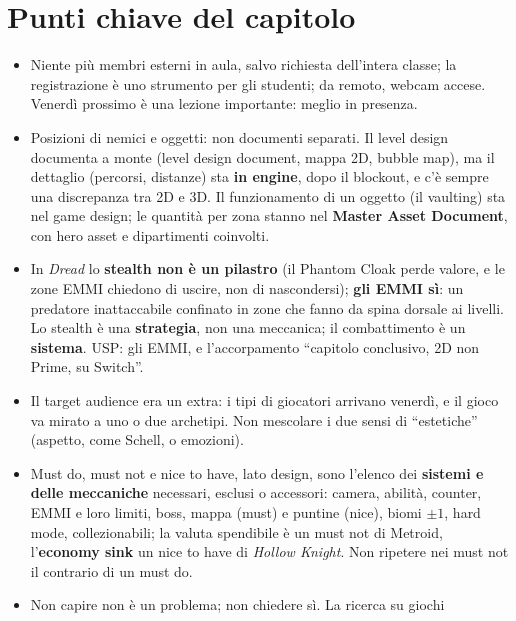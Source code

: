 \section*{Punti chiave del capitolo}

\begin{itemize}
  \item Niente più membri esterni in aula, salvo richiesta dell'intera
        classe; la registrazione è uno strumento per gli studenti; da remoto,
        webcam accese. Venerdì prossimo è una lezione importante: meglio in
        presenza.
  \item Posizioni di nemici e oggetti: non documenti separati. Il level
        design documenta a monte (level design document, mappa 2D, bubble
        map), ma il dettaglio (percorsi, distanze) sta \textbf{in engine},
        dopo il blockout, e c'è sempre una discrepanza tra 2D e 3D. Il
        funzionamento di un oggetto (il vaulting) sta nel game design; le
        quantità per zona stanno nel \textbf{Master Asset Document}, con
        hero asset e dipartimenti coinvolti.
  \item In \emph{Dread} lo \textbf{stealth non è un pilastro} (il Phantom
        Cloak perde valore, e le zone EMMI chiedono di uscire, non di
        nascondersi); \textbf{gli EMMI sì}: un predatore inattaccabile
        confinato in zone che fanno da spina dorsale ai livelli. Lo stealth è
        una \textbf{strategia}, non una meccanica; il combattimento è un
        \textbf{sistema}. USP: gli EMMI, e l'accorpamento ``capitolo
        conclusivo, 2D non Prime, su Switch''.
  \item Il target audience era un extra: i tipi di giocatori arrivano
        venerdì, e il gioco va mirato a uno o due archetipi. Non mescolare i
        due sensi di ``estetiche'' (aspetto, come Schell, o emozioni).
  \item Must do, must not e nice to have, lato design, sono l'elenco dei
        \textbf{sistemi e delle meccaniche} necessari, esclusi o accessori:
        camera, abilità, counter, EMMI e loro limiti, boss, mappa (must) e
        puntine (nice), biomi $\pm 1$, hard mode, collezionabili; la valuta
        spendibile è un must not di Metroid, l'\textbf{economy sink} un nice
        to have di \emph{Hollow Knight}. Non ripetere nei must not il
        contrario di un must do.
  \item Non capire non è un problema; non chiedere sì. La ricerca su giochi

\end{itemize}
